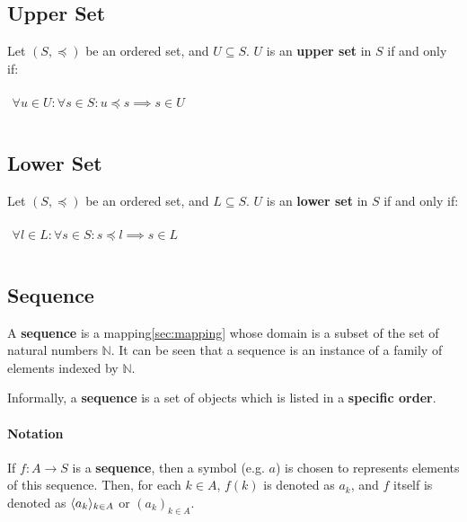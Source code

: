 \subsection{Upper Set}
\label{sec:upper-set}

Let $(S, \preceq)$ be an ordered set, and $U \subseteq S$. $U$ is an
\textbf{upper set} in $S$ if and only if:

\begin{math}
  \begin{array}{c}
    \\
    \forall u \in U : \forall s \in S: u \preceq s \implies s \in U\\
    \\
  \end{array}
\end{math}

\subsection{Lower Set}
\label{sec:lower-set}

Let $(S, \preceq)$ be an ordered set, and $L \subseteq S$. $U$ is an
\textbf{lower set} in $S$ if and only if:

\begin{math}
  \begin{array}{c}
    \\
    \forall l \in L : \forall s \in S: s \preceq l \implies s \in L\\
    \\
  \end{array}
\end{math}


\subsection{Sequence}
\label{sec:sequence}

A \textbf{sequence} is a mapping\ref{sec:mapping} whose domain is a
subset of the set of natural numbers $\mathbb{N}$. It can be seen that
a sequence is an instance of a family of elements indexed by
$\mathbb{N}$.

Informally, a \textbf{sequence} is a set of objects which is listed in
a \textbf{specific order}.

\paragraph{Notation}

If $f : A \to S$ is a \textbf{sequence}, then a symbol (e.g. $a$) is
chosen to represents elements of this sequence. Then, for each
$k \in A$, $f(k)$ is denoted as $a_k$, and $f$ itself is denoted as
$\langle a_k \rangle_{k \in A}$ or $(a_k)_{k \in A}$.

